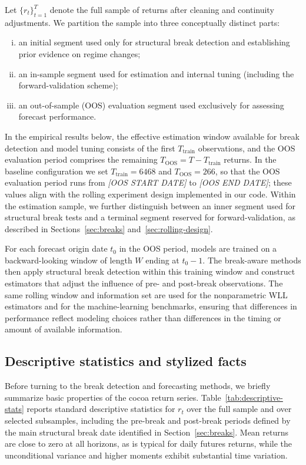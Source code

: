 \documentclass[11pt]{article}
\newcommand{\1}{\mathbf{1}}
\begin{document}
Let $\{r_t\}_{t=1}^T$ denote the full sample of returns after cleaning and continuity adjustments.
We partition the sample into three conceptually distinct parts:

\begin{enumerate}[(i)]
  \item an initial segment used only for structural break detection and establishing prior evidence on regime changes;
  \item an in-sample segment used for estimation and internal tuning (including the forward-validation scheme);
  \item an out-of-sample (OOS) evaluation segment used exclusively for assessing forecast performance.
\end{enumerate}

In the empirical results below, the effective estimation window available for break detection and model tuning consists of the first $T_{\text{train}}$ observations, and the OOS evaluation period comprises the remaining $T_{\text{OOS}} = T - T_{\text{train}}$ returns.
In the baseline configuration we set $T_{\text{train}} = 6468$ and $T_{\text{OOS}} = 266$, so that the OOS evaluation period runs from \emph{[OOS START DATE]} to \emph{[OOS END DATE]}; these values align with the rolling experiment design implemented in our code.
Within the estimation sample, we further distinguish between an inner segment used for structural break tests and a terminal segment reserved for forward-validation, as described in Sections~\ref{sec:breaks} and~\ref{sec:rolling-design}.

For each forecast origin date $t_0$ in the OOS period, models are trained on a backward-looking window of length $W$ ending at $t_0 - 1$.
The break-aware methods then apply structural break detection within this training window and construct estimators that adjust the influence of pre- and post-break observations.
The same rolling window and information set are used for the nonparametric WLL estimators and for the machine-learning benchmarks, ensuring that differences in performance reflect modeling choices rather than differences in the timing or amount of available information.

\subsection{Descriptive statistics and stylized facts}
\label{subsec:data-facts}

Before turning to the break detection and forecasting methods, we briefly summarize basic properties of the cocoa return series.
Table~\ref{tab:descriptive-stats} reports standard descriptive statistics for $r_t$ over the full sample and over selected subsamples, including the pre-break and post-break periods defined by the main structural break date identified in Section~\ref{sec:breaks}.
Mean returns are close to zero at all horizons, as is typical for daily futures returns, while the unconditional variance and higher moments exhibit substantial time variation.
\end{document}
